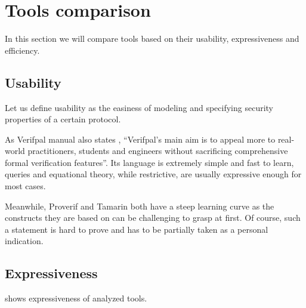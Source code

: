 
\section{Tools comparison}
\label{section:features-comparison}
In this section we will compare tools based on their usability, expressiveness and efficiency.

\subsection{Usability}
Let us define usability as the easiness of modeling and specifying security properties of a certain protocol.

As Verifpal manual also states \cite{VerifpalManual}, ``Verifpal's main aim is to appeal more to real-world practitioners, students and engineers without sacrificing comprehensive formal verification features''. Its language is extremely simple and fast to learn, queries and equational theory, while restrictive, are usually expressive enough for most cases.

Meanwhile, Proverif and Tamarin both have a steep learning curve as the constructs they are based on can be challenging to grasp at first. Of course, such a statement is hard to prove and has to be partially taken as a personal indication.

\subsection{Expressiveness}
 shows expressiveness of analyzed tools.

\begin{table}[!ht]
\renewcommand{\arraystretch}{1.5}
\label{tbl:expressiveness}
\caption{Expressiveness of tools.}
\end{table}

